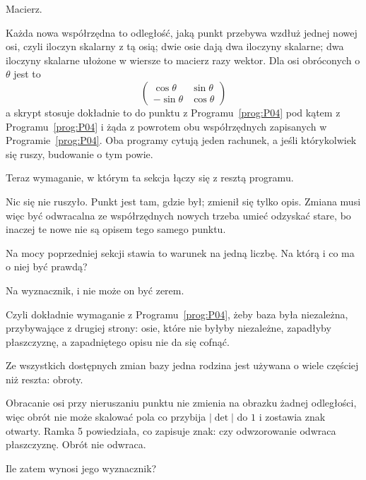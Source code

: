 \begin{fr}
\begin{ansblock}
Macierz.
\end{ansblock}

Każda nowa współrzędna to odległość, jaką punkt przebywa wzdłuż jednej nowej
osi, czyli iloczyn skalarny z tą osią; dwie osie dają dwa iloczyny skalarne;
dwa iloczyny skalarne ułożone w wiersze to macierz razy wektor. Dla osi
obróconych o $\theta$ jest to
\[ \begin{pmatrix} \cos\theta & \sin\theta \\
                   -\sin\theta & \cos\theta \end{pmatrix} \]
a skrypt stosuje dokładnie to do punktu z Programu~\ref{prog:P04} pod kątem z
Programu~\ref{prog:P04} i żąda z powrotem obu współrzędnych zapisanych w
Programie~\ref{prog:P04}. Oba programy cytują jeden rachunek, a jeśli
którykolwiek się ruszy, budowanie o tym powie.
\end{fr}

\begin{fr}
Teraz wymaganie, w którym ta sekcja łączy się z resztą programu.

Nic się nie ruszyło. Punkt jest tam, gdzie był; zmienił się tylko opis. Zmiana
musi więc być odwracalna \dash{} ze współrzędnych nowych trzeba umieć odzyskać
stare, bo inaczej te nowe nie są opisem tego samego punktu.

Na mocy poprzedniej sekcji stawia to warunek na jedną liczbę. Na którą i co ma
o niej być prawdą?
\dotline
\nextframe
\end{fr}

\begin{fr}
\begin{ansblock}
Na wyznacznik, i nie może on być zerem.
\end{ansblock}

Czyli dokładnie wymaganie z Programu~\ref{prog:P04}, żeby baza była niezależna,
przybywające z drugiej strony: osie, które nie byłyby niezależne, zapadłyby
płaszczyznę, a zapadniętego opisu nie da się cofnąć.

Ze wszystkich dostępnych zmian bazy jedna rodzina jest używana o wiele częściej
niż reszta: obroty.

Obracanie osi przy nieruszaniu punktu nie zmienia na obrazku żadnej
odległości, więc obrót nie może skalować pola \dash{} co przybija
$\lvert\det\rvert$ do $1$ i zostawia znak otwarty. Ramka 5 powiedziała, co
zapisuje znak: czy odwzorowanie odwraca płaszczyznę. Obrót nie odwraca.

Ile zatem wynosi jego wyznacznik?
\dotline
\nextframe
\end{fr}

